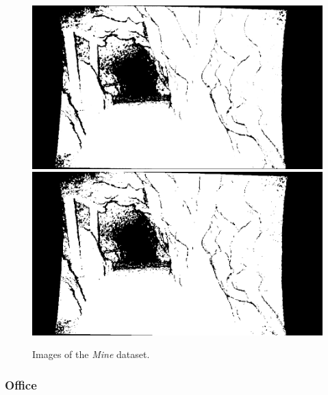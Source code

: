 \begin{figure}[H]
\begin{floatrow}
{    \includegraphics[width=0.5\linewidth]{chapter05/img/lehrpfad/flexion-0000.png}%
    \includegraphics[width=0.5\linewidth]{chapter05/img/lehrpfad/bearing-0000.png}%
    }
    {\caption{Images of the \emph{Mine} dataset.}\label{fig:lehrpfad_data}}
\end{floatrow}
\end{figure}

\subsubsection{Office}

